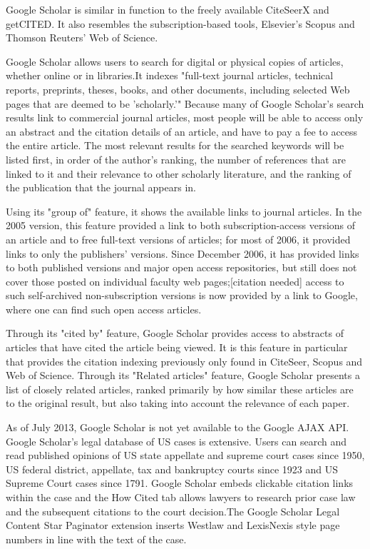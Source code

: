 \begin{enumerate}
	Google Scholar is similar in function to the freely available CiteSeerX and getCITED. It also resembles the subscription-based tools, Elsevier's Scopus and Thomson Reuters' Web of Science.
	
	Google Scholar allows users to search for digital or physical copies of articles, whether online or in libraries.It indexes "full-text journal articles, technical reports, preprints, theses, books, and other documents, including selected Web pages that are deemed to be 'scholarly.'" Because many of Google Scholar's search results link to commercial journal articles, most people will be able to access only an abstract and the citation details of an article, and have to pay a fee to access the entire article. The most relevant results for the searched keywords will be listed first, in order of the author's ranking, the number of references that are linked to it and their relevance to other scholarly literature, and the ranking of the publication that the journal appears in.
	
	Using its "group of" feature, it shows the available links to journal articles. In the 2005 version, this feature provided a link to both subscription-access versions of an article and to free full-text versions of articles; for most of 2006, it provided links to only the publishers' versions. Since December 2006, it has provided links to both published versions and major open access repositories, but still does not cover those posted on individual faculty web pages;[citation needed] access to such self-archived non-subscription versions is now provided by a link to Google, where one can find such open access articles.
	
	Through its "cited by" feature, Google Scholar provides access to abstracts of articles that have cited the article being viewed. It is this feature in particular that provides the citation indexing previously only found in CiteSeer, Scopus and Web of Science. Through its "Related articles" feature, Google Scholar presents a list of closely related articles, ranked primarily by how similar these articles are to the original result, but also taking into account the relevance of each paper.
	
	As of July 2013, Google Scholar is not yet available to the Google AJAX API.\\
	
	Google Scholar's legal database of US cases is extensive. Users can search and read published opinions of US state appellate and supreme court cases since 1950, US federal district, appellate, tax and bankruptcy courts since 1923 and US Supreme Court cases since 1791. Google Scholar embeds clickable citation links within the case and the How Cited tab allows lawyers to research prior case law and the subsequent citations to the court decision.The Google Scholar Legal Content Star Paginator extension inserts Westlaw and LexisNexis style page numbers in line with the text of the case.\\
	

\end{enumerate}
